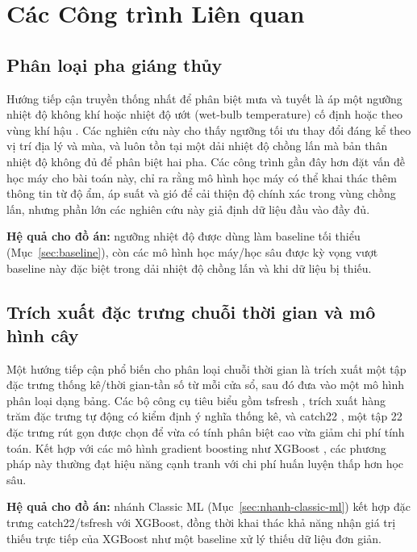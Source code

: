 \section{Các Công trình Liên quan}
\label{sec:tong-quan-tai-lieu}

\subsection{Phân loại pha giáng thủy}
\label{sec:lit-phan-loai-giang-thuy}

Hướng tiếp cận truyền thống nhất để phân biệt mưa và tuyết là áp một ngưỡng nhiệt độ
không khí hoặc nhiệt độ ướt (wet-bulb temperature) cố định hoặc theo vùng khí hậu
\cite{jennings2018}. Các nghiên cứu này cho thấy ngưỡng tối ưu thay đổi đáng kể theo vị
trí địa lý và mùa, và luôn tồn tại một dải nhiệt độ chồng lấn mà bản thân nhiệt độ không
đủ để phân biệt hai pha. Các công trình gần đây hơn \cite{webb2025} đặt vấn đề học máy
cho bài toán này, chỉ ra rằng mô hình học máy có thể khai thác thêm thông tin từ độ ẩm,
áp suất và gió để cải thiện độ chính xác trong vùng chồng lấn, nhưng phần lớn các nghiên
cứu này giả định dữ liệu đầu vào đầy đủ.

\textbf{Hệ quả cho đồ án:} ngưỡng nhiệt độ được dùng làm baseline tối thiểu
(Mục~\ref{sec:baseline}), còn các mô hình học máy/học sâu được kỳ vọng vượt baseline này
đặc biệt trong dải nhiệt độ chồng lấn và khi dữ liệu bị thiếu.

\subsection{Trích xuất đặc trưng chuỗi thời gian và mô hình cây}
\label{sec:lit-feature-tree}

Một hướng tiếp cận phổ biến cho phân loại chuỗi thời gian là trích xuất một tập đặc
trưng thống kê/thời gian-tần số từ mỗi cửa sổ, sau đó đưa vào một mô hình phân loại dạng
bảng. Các bộ công cụ tiêu biểu gồm tsfresh \cite{christ2018tsfresh}, trích xuất hàng trăm
đặc trưng tự động có kiểm định ý nghĩa thống kê, và catch22 \cite{lubba2019catch22}, một
tập 22 đặc trưng rút gọn được chọn để vừa có tính phân biệt cao vừa giảm chi phí tính
toán. Kết hợp với các mô hình gradient boosting như XGBoost \cite{chen2016xgboost}, các
phương pháp này thường đạt hiệu năng cạnh tranh với chi phí huấn luyện thấp hơn học sâu.

\textbf{Hệ quả cho đồ án:} nhánh Classic ML (Mục~\ref{sec:nhanh-classic-ml}) kết hợp đặc
trưng catch22/tsfresh với XGBoost, đồng thời khai thác khả năng nhận giá trị thiếu trực
tiếp của XGBoost như một baseline xử lý thiếu dữ liệu đơn giản.

